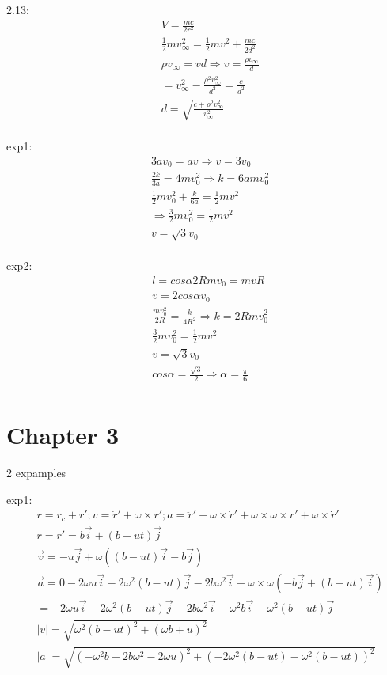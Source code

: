 \documentclass{article}
\begin{document}
2.13:
\begin{align*}
  &V=\frac{mc}{2r^2} \\
  &\frac12mv_{\infty}^2=\frac12mv^2+\frac{mc}{2d^2} \\
  &\rho v_{\infty}=vd\Rightarrow v=\frac{\rho v_{\infty}}{d} \\
  &=v_{\infty}^2-\frac{\rho^2v_{\infty}^2}{d^2}=\frac{c}{d^2} \\
  &d=\sqrt{\frac{c+\rho^2v_{\infty}^2}{v_{\infty}^2}} \\
\end{align*}

exp1:
\begin{align*}
&3av_0=av\Rightarrow v=3v_0 \\
&\frac{2k}{3a}=4mv_0^2\Rightarrow k=6amv_0^2  \\
&\frac12mv_0^2+\frac{k}{6a}=\frac12mv^2 \\
&\Rightarrow \frac32mv_0^2=\frac12mv^2  \\
&v=\sqrt{3}v_0 \\
\end{align*}

exp2:
\begin{align*}
&l=cos\alpha2Rmv_0=mvR \\
&v=2cos\alpha v_0 \\
&\frac{mv_0^2}{2R}=\frac{k}{4R^2}\Rightarrow k=2Rmv_0^2 \\
&\frac32mv_0^2=\frac12mv^2 \\
&v=\sqrt{3}v_0 \\
&cos\alpha=\frac{\sqrt{3}}2\Rightarrow \alpha=\frac{\pi}6 \\
\end{align*}

\section{Chapter 3}
2 expamples

exp1:
\begin{align*}
&r=r_c+r';v=\dot r'+\omega\times r';a=\ddot r'+\omega\times \dot r'+\omega\times\omega\times r'+\omega\times\dot r' \\
&r=r'=b\vec i+(b-ut)\vec j \\
&\vec v=-u\vec j+\omega((b-ut)\vec i-b\vec j) \\
&\vec a=0-2\omega u\vec i-2\omega^2(b-ut)\vec j-2b\omega^2 \vec i+\omega\times\omega(-b\vec j+(b-ut) \vec i) \\
&=-2\omega u\vec i-2\omega^2(b-ut)\vec j-2b\omega^2 \vec i-\omega^2b\vec i-\omega^2(b-ut)\vec j \\
&|v|=\sqrt{\omega^2(b-ut)^2+(\omega b+u)^2} \\
&|a|=\sqrt{(-\omega^2b-2b\omega^2-2\omega u)^2+(-2\omega^2(b-ut)-\omega^2(b-ut))^2} \\
\end{align*}
\end{document}
